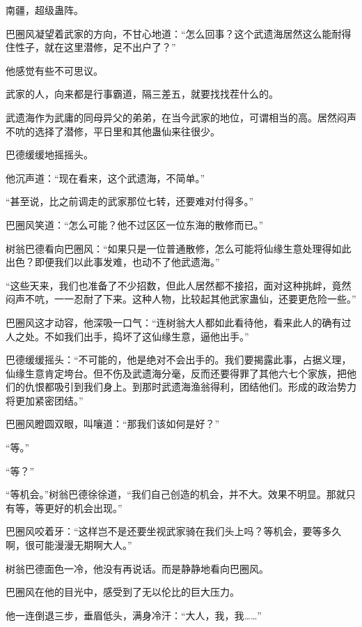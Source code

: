 
\begin{this_body}



南疆，超级蛊阵。

巴圈风凝望着武家的方向，不甘心地道：“怎么回事？这个武遗海居然这么能耐得住性子，就在这里潜修，足不出户了？”

他感觉有些不可思议。

武家的人，向来都是行事霸道，隔三差五，就要找找茬什么的。

武遗海作为武庸的同母异父的弟弟，在当今武家的地位，可谓相当的高。居然闷声不吭的选择了潜修，平日里和其他蛊仙来往很少。

巴德缓缓地摇摇头。

他沉声道：“现在看来，这个武遗海，不简单。”

“甚至说，比之前调走的武家那位七转，还要难对付得多。”

巴圈风笑道：“怎么可能？他不过区区一位东海的散修而已。”

树翁巴德看向巴圈风：“如果只是一位普通散修，怎么可能将仙缘生意处理得如此出色？即便我们以此事发难，也动不了他武遗海。”

“这些天来，我们也准备了不少招数，但此人居然都不接招，面对这种挑衅，竟然闷声不吭，一一忍耐了下来。这种人物，比较起其他武家蛊仙，还要更危险一些。”

巴圈风这才动容，他深吸一口气：“连树翁大人都如此看待他，看来此人的确有过人之处。不如我们出手，捣坏了这仙缘生意，逼他出手。”

巴德缓缓摇头：“不可能的，他是绝对不会出手的。我们要揭露此事，占据义理，仙缘生意肯定垮台。但不伤及武遗海分毫，反而还要得罪了其他六七个家族，把他们的仇恨都吸引到我们身上。到那时武遗海渔翁得利，团结他们。形成的政治势力将更加紧密团结。”

巴圈风瞪圆双眼，叫嚷道：“那我们该如何是好？”

“等。”

“等？”

“等机会。”树翁巴德徐徐道，“我们自己创造的机会，并不大。效果不明显。那就只有等，等更好的机会出现。”

巴圈风咬着牙：“这样岂不是还要坐视武家骑在我们头上吗？等机会，要等多久啊，很可能漫漫无期啊大人。”

树翁巴德面色一冷，他没有再说话。而是静静地看向巴圈风。

巴圈风在他的目光中，感受到了无以伦比的巨大压力。

他一连倒退三步，垂眉低头，满身冷汗：“大人，我，我……”


\end{this_body}
